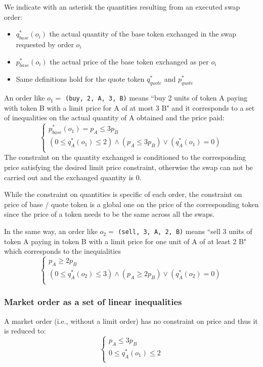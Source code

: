 \documentclass[11pt, reqno]{amsart}
\begin{document}
We indicate with an asterisk the quantities resulting from an executed swap
order:
\begin{itemize}
  \item $q_{base}^*(o_i)$ the actual quantity of the base token exchanged in
    the swap requested by order $o_i$
  \item $p_{base}^*(o_i)$ the actual price of the base token exchanged as per
    $o_i$
  \item Same definitions hold for the quote token $q_{quote}^*$ and $p_{quote}^*$
\end{itemize}

An order like $o_1 =$ \texttt{(buy, 2, A, 3, B)} means ``buy 2 units of token A
paying with token B with a limit price for A of at most 3 B" and it corresponds to a
set of inequalities on the actual quantity of A obtained and the price paid:
\begin{equation}
  \begin{cases}
    p_{base}^*(o_1) = p_A \le 3 p_B \\
    (0 \le q_{A}^*(o_1) \le 2) \land (p_A \le 3 p_B) \lor (q_A^*(o_1) = 0)\\
  \end{cases}
\end{equation}
The constraint on the quantity exchanged is conditioned to the corresponding
price satisfying the desired limit price constraint, otherwise the swap can not
be carried out and the exchanged quantity is 0.

While the constraint on quantities is specific of each order, the constraint on
price of base / quote token is a global one on the price of the corresponding
token since the price of a token needs to be the same across all the swaps.

In the same way, an order like $o_2 =$ \texttt{(sell, 3, A, 2, B)} means ``sell
3 units of token A paying in token B with a limit price for one unit of A of at
least 2 B" which corresponds to the inequialities
\begin{equation}
  \begin{cases}
    p_A \ge 2 p_B \\
    (0 \le q_{A}^*(o_2) \le 3) \land (p_A \ge 2 p_B) \lor (q_A^*(o_2) = 0)\\
  \end{cases}
\end{equation}

\subsubsection{Market order as a set of linear inequalities}
A market order (i.e., without a limit order) has no constraint on price and thus
it is reduced to:
\begin{equation}
  \begin{cases}
    p_A \le 3 p_B \\
    0 \le q_{A}^*(o_1) \le 2 \\
  \end{cases}
\end{equation}
\end{document}
